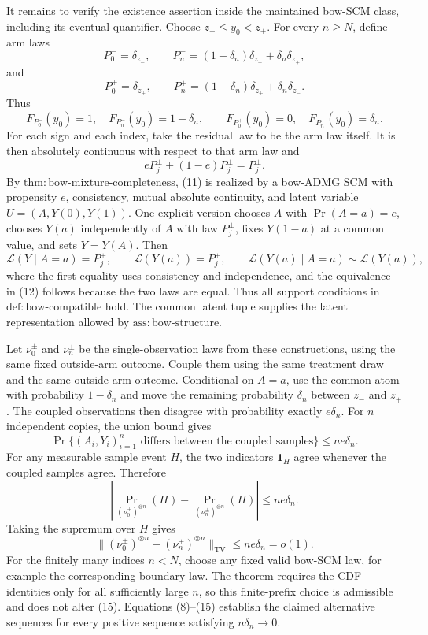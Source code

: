It remains to verify the existence assertion inside the maintained bow-SCM class, including its eventual quantifier.  Choose \(z_-\le y_0<z_+\).  For every \(n\ge N\), define arm laws
\[
  P_0^- =\delta_{z_-},
  \qquad
  P_n^-=(1-\delta_n)\delta_{z_-}+\delta_n\delta_{z_+},
  \tag{8}
\]
and
\[
  P_0^+ =\delta_{z_+},
  \qquad
  P_n^+=(1-\delta_n)\delta_{z_+}+\delta_n\delta_{z_-}.
  \tag{9}
\]
Thus
\[
  F_{P_0^-}(y_0)=1,
  \quad F_{P_n^-}(y_0)=1-\delta_n,
  \qquad
  F_{P_0^+}(y_0)=0,
  \quad F_{P_n^+}(y_0)=\delta_n.
  \tag{10}
\]
For each sign and each index, take the residual law to be the arm law itself.  It is then absolutely continuous with respect to that arm law and
\[
  eP_j^\pm+(1-e)P_j^\pm=P_j^\pm.
  \tag{11}
\]
By \(\mathrm{thm:bow\text{-}mixture\text{-}completeness}\), (11) is realized by a bow-ADMG SCM with propensity \(e\), consistency, mutual absolute continuity, and latent variable \(U=(A,Y(0),Y(1))\).  One explicit version chooses \(A\) with \(\Pr(A=a)=e\), chooses \(Y(a)\) independently of \(A\) with law \(P_j^\pm\), fixes \(Y(1-a)\) at a common value, and sets \(Y=Y(A)\).  Then
\[
  \mathcal L(Y\mid A=a)=P_j^\pm,
  \qquad
  \mathcal L(Y(a))=P_j^\pm,
  \qquad
  \mathcal L(Y(a)\mid A=a)\sim\mathcal L(Y(a)),
  \tag{12}
\]
where the first equality uses consistency and independence, and the equivalence in (12) follows because the two laws are equal.  Thus all support conditions in \(\mathrm{def:bow\text{-}compatible}\) hold.  The common latent tuple supplies the latent representation allowed by \(\mathrm{ass:bow\text{-}structure}\).

Let \(\nu_0^\pm\) and \(\nu_n^\pm\) be the single-observation laws from these constructions, using the same fixed outside-arm outcome.  Couple them using the same treatment draw and the same outside-arm outcome.  Conditional on \(A=a\), use the common atom with probability \(1-\delta_n\) and move the remaining probability \(\delta_n\) between \(z_-\) and \(z_+\).  The coupled observations then disagree with probability exactly \(e\delta_n\).  For \(n\) independent copies, the union bound gives
\[
  \Pr\{(A_i,Y_i)_{i=1}^n
          \text{ differs between the coupled samples}\}
  \le ne\delta_n.
  \tag{13}
\]
For any measurable sample event \(H\), the two indicators \(\mathbf 1_H\) agree whenever the coupled samples agree.  Therefore
\[
  \left|\Pr_{(\nu_0^\pm)^{\otimes n}}(H)
        -\Pr_{(\nu_n^\pm)^{\otimes n}}(H)\right|
  \le ne\delta_n.
  \tag{14}
\]
Taking the supremum over \(H\) gives
\[
  \lVert(\nu_0^\pm)^{\otimes n}
          -(\nu_n^\pm)^{\otimes n}\rVert_{\mathrm{TV}}
  \le ne\delta_n=o(1).
  \tag{15}
\]
For the finitely many indices \(n<N\), choose any fixed valid bow-SCM law, for example the corresponding boundary law.  The theorem requires the CDF identities only for all sufficiently large \(n\), so this finite-prefix choice is admissible and does not alter (15).  Equations (8)--(15) establish the claimed alternative sequences for every positive sequence satisfying \(n\delta_n\to0\).

